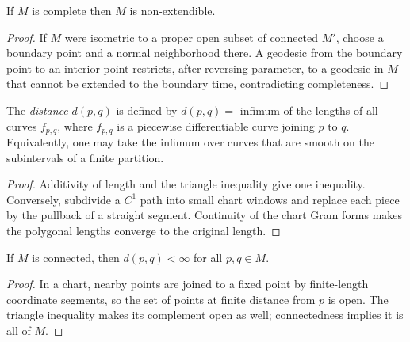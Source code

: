 \begin{proposition}

  \label{prop:dc-ch7-2-3}


If $M$ is complete then $M$ is non-extendible.
\end{proposition}
\begin{proof}


\sketch If $M$ were isometric to a proper open subset of connected $M'$, choose a boundary point and a normal neighborhood there. A geodesic from the boundary point to an interior point restricts, after reversing parameter, to a geodesic in $M$ that cannot be extended to the boundary time, contradicting completeness.
\end{proof}

\begin{definition}[distance]

  \label{def:dc-ch7-2-4}


The \emph{distance} $d(p,q)$ is defined by $d(p,q)=$ infimum of the lengths of all
  curves $f_{p,q}$, where $f_{p,q}$ is a piecewise differentiable curve joining $p$
  to $q$. Equivalently, one may take the infimum over curves that are smooth on
  the subintervals of a finite partition.
\end{definition}
\begin{proof}
\sketch Additivity of length and the triangle inequality give one inequality.
  Conversely, subdivide a $C^1$ path into small chart windows and replace each
  piece by the pullback of a straight segment. Continuity of the chart Gram
  forms makes the polygonal lengths converge to the original length.
\end{proof}

\begin{lemma}

  \label{lem:dc-ch7-2-4-finite}


If $M$ is connected, then $d(p,q)<\infty$ for all $p,q\in M$.
\end{lemma}
\begin{proof}


\sketch In a chart, nearby points are joined to a fixed point by finite-length coordinate segments, so the set of points at finite distance from $p$ is open. The triangle inequality makes its complement open as well; connectedness implies it is all of $M$.
\end{proof}

